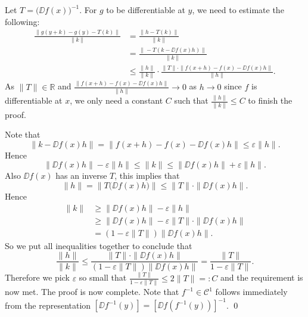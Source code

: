 \documentclass[11pt]{article}
\begin{document}
Let $T = \bigl(\DD f(x)\bigr)^{-1}$.
For $g$ to be differentiable at $y$, we need to estimate the following:
\begin{align*}
  \frac{ \| g(y+k) - g(y) - T(k) \| }{ \| k \| } &= \frac{ \| h - T(k) \| }{ \| k \| } \\
  &= \frac{ \| - T ( k - \DD f(x) h ) \| }{ \| k \| } \\
  &\leqslant \frac{ \| h \| }{\| k \|} \cdot \frac{ \| T \| \cdot \| f(x+h) - f(x) - \DD f(x) h \| }{ \| h \| }.
\end{align*}
As $\| T \| \in \mathbb{R}$ and $\displaystyle \frac{ \| f(x+h) - f(x) - \DD f(x) h \| }{ \| h \| } \to 0$ as $h \to  0$ since $f$ is differentiable at $x$, we only need a constant $C$ such that $\displaystyle \frac{ \| h \| }{ \| k \| } \leqslant C$ to finish the proof.

Note that
\begin{equation*}
  \| k - \DD f(x) h \| = \| f(x+h) - f(x) - \DD f(x) h \| \leqslant \varepsilon \| h \|.
\end{equation*}
Hence
\begin{equation*}
  \| \DD f(x) h \| - \varepsilon \| h \| \leqslant \| k \| \leqslant \| \DD f(x) h \| + \varepsilon \| h \|.
\end{equation*}
Also $\DD f(x)$ has an inverse $T$, this implies that
\begin{equation*}
  \| h \| = \| T \bigl( \DD f(x) h \bigr) \| \leqslant \| T \| \cdot \| \DD f(x) h \|.
\end{equation*}
Hence
\begin{align*}
  \| k \| &\geq \| \DD f(x) h \| - \varepsilon \| h \| \\
  &\geqslant \| \DD f(x) h \| - \varepsilon \| T \| \cdot \| \DD f(x) h \| \\
  &= (1 - \varepsilon \| T \|) \| \DD f(x) h \|.
\end{align*}
So we put all inequalities together to conclude that
\begin{equation*}
  \frac{ \| h \| }{ \| k \| } \leqslant \frac{ \| T \| \cdot \| \DD f(x) h \| }{ (1 - \varepsilon \| T \|) \| \DD f(x) h \| } = \frac{ \| T \| }{ 1 - \varepsilon \| T \| }.
\end{equation*}
Therefore we pick $\varepsilon$ so small that $\displaystyle \frac{ \| T \| }{ 1 - \varepsilon \| T \| } \leqslant 2 \| T \| =: C$ and the requirement is now met.  
The proof is now complete. 
Note that $f^{-1} \in \mathcal C^1$ follows immediately from the representation $[\DD f^{-1}(y)] = [ \DD f(f^{-1}(y)) ]^{-1}$.
\qed
\end{document}
